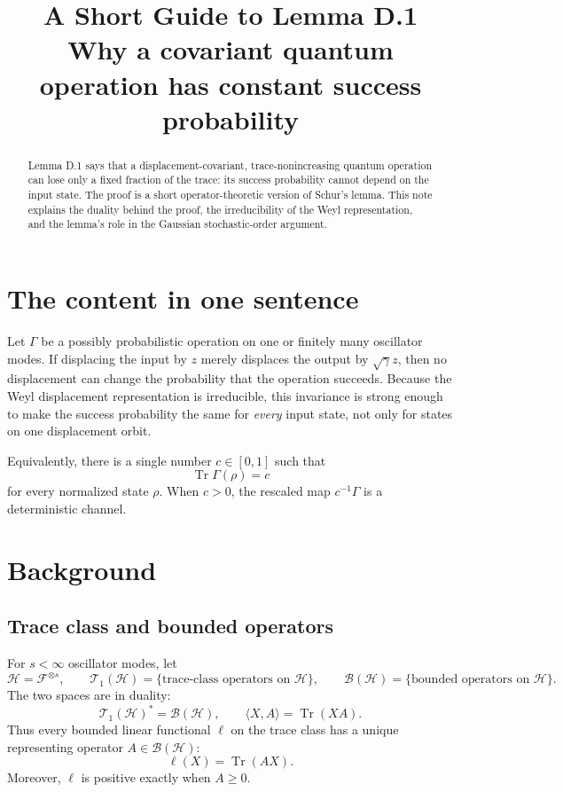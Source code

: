\documentclass[11pt]{article}
\title{A Short Guide to Lemma D.1\\
\large Why a covariant quantum operation has constant success probability}
\author{}
\date{}
\newcommand{\F}{\mathcal F}
\newcommand{\Hc}{\mathcal H}
\newcommand{\T}{\mathcal T_1}
\newcommand{\Bop}{\mathcal B}
\newcommand{\Tr}{\operatorname{Tr}}
\begin{document}
\maketitle

\begin{abstract}
Lemma D.1 says that a displacement-covariant, trace-nonincreasing quantum
operation can lose only a fixed fraction of the trace: its success
probability cannot depend on the input state.  The proof is a short
operator-theoretic version of Schur's lemma.  This note explains the duality
behind the proof, the irreducibility of the Weyl representation, and the
lemma's role in the Gaussian stochastic-order argument.
\end{abstract}

\section{The content in one sentence}

Let $\Gamma$ be a possibly probabilistic operation on one or finitely many
oscillator modes.  If displacing the input by $z$ merely displaces the output
by $\sqrt\gamma z$, then no displacement can change the probability that the
operation succeeds.  Because the Weyl displacement representation is
irreducible, this invariance is strong enough to make the success probability
the same for \emph{every} input state, not only for states on one displacement
orbit.

Equivalently, there is a single number $c\in[0,1]$ such that
\[
  \Tr\Gamma(\rho)=c
\]
for every normalized state $\rho$.  When $c>0$, the rescaled map
$c^{-1}\Gamma$ is a deterministic channel.

\section{Background}

\subsection{Trace class and bounded operators}

For $s<\infty$ oscillator modes, let
\[
  \Hc=\F^{\otimes s},
  \qquad
  \T(\Hc)=\{\text{trace-class operators on }\Hc\},
  \qquad
  \Bop(\Hc)=\{\text{bounded operators on }\Hc\}.
\]
The two spaces are in duality:
\[
  \T(\Hc)^*=\Bop(\Hc),
  \qquad
  \langle X,A\rangle=\Tr(XA).
\]
Thus every bounded linear functional $\ell$ on the trace class has a unique
representing operator $A\in\Bop(\Hc)$:
\begin{equation}\label{eq:dual-representation}
  \ell(X)=\Tr(AX).
\end{equation}
Moreover, $\ell$ is positive exactly when $A\geq0$.
\end{document}
